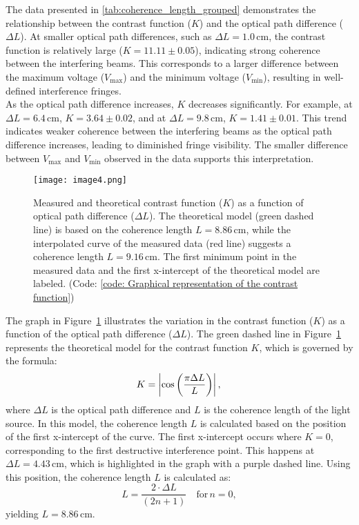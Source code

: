 \documentclass[a4paper,11pt]{article}
\begin{document}
The data presented in \autoref{tab:coherence_length_grouped} demonstrates the relationship between the contrast function ($K$) and the optical path difference ($\Delta L$). At smaller optical path differences, such as $\Delta L = 1.0 \, \text{cm}$, the contrast function is relatively large ($K = 11.11 \pm 0.05$), indicating strong coherence between the interfering beams. This corresponds to a larger difference between the maximum voltage ($V_{\text{max}}$) and the minimum voltage ($V_{\text{min}}$), resulting in well-defined interference fringes.\\

As the optical path difference increases, $K$ decreases significantly. For example, at $\Delta L = 6.4 \, \text{cm}$, $K = 3.64 \pm 0.02$, and at $\Delta L = 9.8 \, \text{cm}$, $K = 1.41 \pm 0.01$. This trend indicates weaker coherence between the interfering beams as the optical path difference increases, leading to diminished fringe visibility. The smaller difference between $V_{\text{max}}$ and $V_{\text{min}}$ observed in the data supports this interpretation.\\


\begin{figure}[H]
    \centering
    \texttt{[image: image4.png]}
    \caption{Measured and theoretical contrast function (\( K \)) as a function of optical path difference (\( \Delta L \)). The theoretical model (green dashed line) is based on the coherence length \( L = 8.86 \, \text{cm} \), while the interpolated curve of the measured data (red line) suggests a coherence length \( L = 9.16 \, \text{cm} \). The first minimum point in the measured data and the first x-intercept of the theoretical model are labeled. (Code: \autoref{code: Graphical representation of the contrast function})}
    \label{fig:contrast_function}
\end{figure}

The graph in Figure~\ref{fig:contrast_function} illustrates the variation in the contrast function (\( K \)) as a function of the optical path difference (\( \Delta L \)). The green dashed line in Figure~\ref{fig:contrast_function} represents the theoretical model for the contrast function \( K \), which is governed by the formula:
\[
K = \left| \cos\left(\frac{\pi \Delta L}{L}\right) \right|,\\
\]
where \( \Delta L \) is the optical path difference and \( L \) is the coherence length of the light source. In this model, the coherence length \( L \) is calculated based on the position of the first x-intercept of the curve. The first x-intercept occurs where \( K = 0 \), corresponding to the first destructive interference point. This happens at \( \Delta L = 4.43 \, \text{cm} \), which is highlighted in the graph with a purple dashed line. Using this position, the coherence length \( L \) is calculated as:
\[
L = \frac{2 \cdot \Delta L}{(2n + 1)} \quad \text{for} \, n = 0,
\]
yielding \( L = 8.86 \, \text{cm} \).\\
\end{document}

